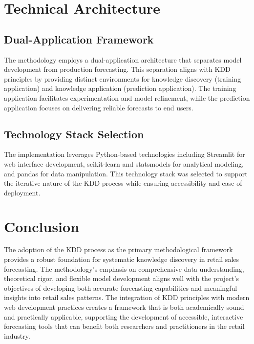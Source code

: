 \section{Technical Architecture}
\label{sec:technical_architecture}

\subsection{Dual-Application Framework}
\label{subsec:dual_application}

The methodology employs a dual-application architecture that separates model development from production forecasting. This separation aligns with KDD principles by providing distinct environments for knowledge discovery (training application) and knowledge application (prediction application). The training application facilitates experimentation and model refinement, while the prediction application focuses on delivering reliable forecasts to end users.

\subsection{Technology Stack Selection}
\label{subsec:technology_stack}

The implementation leverages Python-based technologies including Streamlit for web interface development, scikit-learn and statsmodels for analytical modeling, and pandas for data manipulation. This technology stack was selected to support the iterative nature of the KDD process while ensuring accessibility and ease of deployment.

\section{Conclusion}
\label{sec:methodology_conclusion}

The adoption of the KDD process as the primary methodological framework provides a robust foundation for systematic knowledge discovery in retail sales forecasting. The methodology's emphasis on comprehensive data understanding, theoretical rigor, and flexible model development aligns well with the project's objectives of developing both accurate forecasting capabilities and meaningful insights into retail sales patterns. The integration of KDD principles with modern web development practices creates a framework that is both academically sound and practically applicable, supporting the development of accessible, interactive forecasting tools that can benefit both researchers and practitioners in the retail industry.